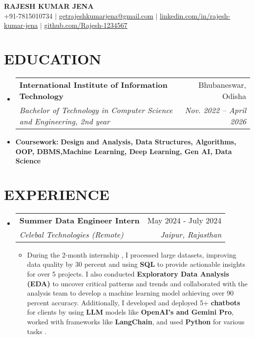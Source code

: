 \documentclass[letterpaper,11pt]{article}
\makeatletter
\newcommand{\resumeItem}[1]{\item\small{#1 \vspace{-2pt}}}
\newcommand{\resumeSubheading}[4]{
  \vspace{-2pt}\item
    \begin{tabular*}{0.97\textwidth}[t]{l@{\extracolsep{\fill}}r}
      \textbf{#1} & #2 \\
      \textit{\small#3} & \textit{\small #4} \\
    \end{tabular*}\vspace{-7pt}
}
\newcommand{\resumeSubHeadingListStart}{\begin{itemize}[leftmargin=0.15in, label={}]}
\newcommand{\resumeSubHeadingListEnd}{\end{itemize}}
\newcommand{\resumeItemListStart}{\begin{itemize}}
\newcommand{\resumeItemListEnd}{\end{itemize}\vspace{-5pt}}
\makeatother
\begin{document}
\begin{center}
    \textbf{\Huge \scshape RAJESH KUMAR JENA} \\ \vspace{1pt}
    \small +91-7815010734 $|$ \href{mailto:getrajeshkumarjena@gmail.com}{\underline{getrajeshkumarjena@gmail.com}} $|$ 
    \href{https://linkedin.com/in/rajesh-kumar-jena}{\underline{linkedin.com/in/rajesh-kumar-jena}} $|$
    \href{https://github.com/Rajesh-1234567}{\underline{github.com/Rajesh-1234567}}
\end{center}

\section{\textbf{EDUCATION}}
\resumeSubHeadingListStart
    \resumeSubheading
      {International Institute of Information Technology}{Bhubaneswar, Odisha}
      {Bachelor of Technology in Computer Science and Engineering, 2nd year}{Nov. 2022 -- April 2026}
      \resumeItem{\textbf{Coursework:} \textbf{Design and Analysis, Data Structures, Algorithms, OOP, DBMS,Machine Learning, Deep Learning, Gen AI, Data Science}}
\resumeSubHeadingListEnd

\section{\textbf{EXPERIENCE}}
\resumeSubHeadingListStart
    \resumeSubheading
      {Summer Data Engineer Intern}{May 2024 - July 2024}
      {Celebal Technologies (Remote)}{Jaipur, Rajasthan}
      \resumeItemListStart
        \resumeItem{During the 2-month internship , I processed large datasets, improving data quality by 30 percent and using \textbf{SQL} to provide actionable insights for over 5 projects. I also conducted \textbf{Exploratory Data Analysis (EDA)} to uncover critical patterns and trends and collaborated with the analysis team to develop a machine learning model achieving over 90 percent accuracy. Additionally, I developed and deployed 5+ \textbf{chatbots} for clients by using \textbf{LLM} models like \textbf{OpenAI's and Gemini Pro}, worked with frameworks like \textbf{LangChain}, and used \textbf{Python} for various tasks .}
      \resumeItemListEnd
\resumeSubHeadingListEnd

\end{document}
